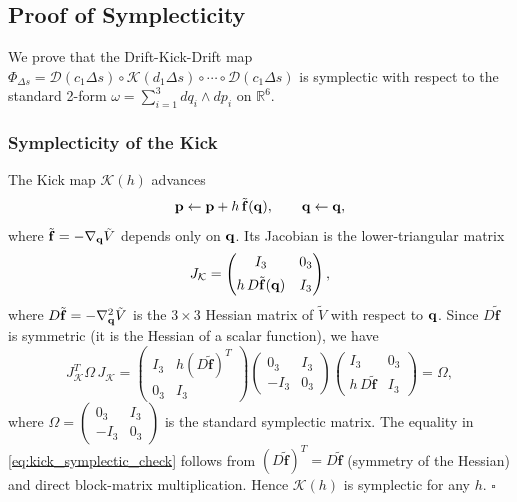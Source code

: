 
\subsection{Proof of Symplecticity}
\label{sec:symplecticity_proof}

We prove that the Drift-Kick-Drift map
$\Phi_{\Delta s} = \mathcal{D}(c_1\Delta s)\circ\mathcal{K}(d_1\Delta s)
\circ\cdots\circ\mathcal{D}(c_1\Delta s)$
is symplectic with respect to the standard 2-form
$\omega = \sum_{i=1}^3 dq_i \wedge dp_i$ on
$\mathbb{R}^6$.

\subsubsection{Symplecticity of the Kick}
\label{sec:kick_symplectic}

The Kick map $\mathcal{K}(h)$ advances
\begin{equation}
  \mathbf{p} \leftarrow \mathbf{p} + h\,\tilde{\mathbf{f}}(\mathbf{q}),
  \qquad
  \mathbf{q} \leftarrow \mathbf{q},
  \label{eq:kick_map}
\end{equation}
where $\tilde{\mathbf{f}} = -\nabla_{\mathbf{q}}\tilde{V}$ depends only
on $\mathbf{q}$. Its Jacobian is the lower-triangular matrix
\begin{equation}
  J_{\mathcal{K}} =
  \begin{pmatrix}
    I_3 & 0_3 \\[4pt]
    h\,D\tilde{\mathbf{f}}(\mathbf{q}) & I_3
  \end{pmatrix},
  \label{eq:kick_jacobian}
\end{equation}
where $D\tilde{\mathbf{f}} = -\nabla_{\mathbf{q}}^2\tilde{V}$ is the
$3\times3$ Hessian matrix of $\tilde{V}$ with respect to $\mathbf{q}$.
Since $D\tilde{\mathbf{f}}$ is symmetric (it is the Hessian of a
scalar function), we have
\begin{equation}
  J_{\mathcal{K}}^T \Omega\, J_{\mathcal{K}}
  = \begin{pmatrix} I_3 & h(D\tilde{\mathbf{f}})^T \\ 0_3 & I_3 \end{pmatrix}
    \begin{pmatrix} 0_3 & I_3 \\ -I_3 & 0_3 \end{pmatrix}
    \begin{pmatrix} I_3 & 0_3 \\ h\,D\tilde{\mathbf{f}} & I_3 \end{pmatrix}
  = \Omega,
  \label{eq:kick_symplectic_check}
\end{equation}
where $\Omega = \begin{pmatrix} 0_3 & I_3 \\ -I_3 & 0_3 \end{pmatrix}$
is the standard symplectic matrix. The equality in
\eqref{eq:kick_symplectic_check} follows from
$(D\tilde{\mathbf{f}})^T = D\tilde{\mathbf{f}}$ (symmetry of the Hessian)
and direct block-matrix multiplication.
Hence $\mathcal{K}(h)$ is symplectic for any $h$. $\square$

